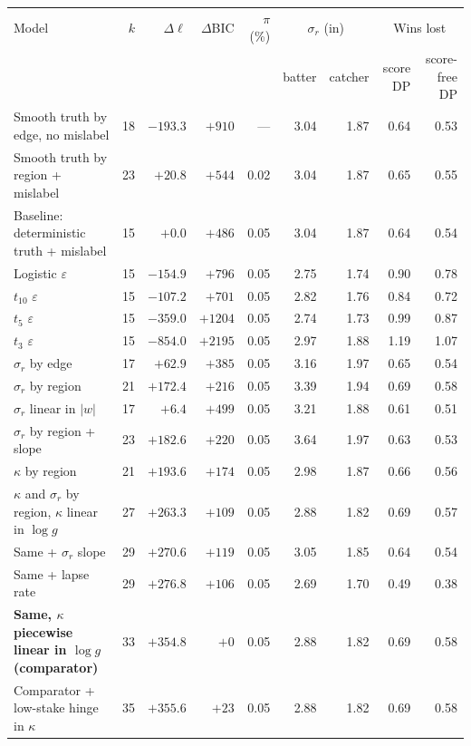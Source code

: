 \begin{tabular}{lrrrrrrrr}
\toprule
Model & $k$ & $\Delta\ell$ & $\Delta$BIC & $\pi$ (\%) & \multicolumn{2}{c}{$\sigma_r$ (in)} & \multicolumn{2}{c}{Wins lost} \\
& & & & & batter & catcher & score DP & score-free DP \\
\midrule
Smooth truth by edge, no mislabel & 18 & $-193.3$ & $+910$ & --- & 3.04 & 1.87 & 0.64 & 0.53 \\
Smooth truth by region + mislabel & 23 & $+20.8$ & $+544$ & 0.02 & 3.04 & 1.87 & 0.65 & 0.55 \\
Baseline: deterministic truth + mislabel & 15 & $+0.0$ & $+486$ & 0.05 & 3.04 & 1.87 & 0.64 & 0.54 \\
Logistic $\varepsilon$ & 15 & $-154.9$ & $+796$ & 0.05 & 2.75 & 1.74 & 0.90 & 0.78 \\
$t_{10}$ $\varepsilon$ & 15 & $-107.2$ & $+701$ & 0.05 & 2.82 & 1.76 & 0.84 & 0.72 \\
$t_{5}$ $\varepsilon$ & 15 & $-359.0$ & $+1204$ & 0.05 & 2.74 & 1.73 & 0.99 & 0.87 \\
$t_{3}$ $\varepsilon$ & 15 & $-854.0$ & $+2195$ & 0.05 & 2.97 & 1.88 & 1.19 & 1.07 \\
$\sigma_r$ by edge & 17 & $+62.9$ & $+385$ & 0.05 & 3.16 & 1.97 & 0.65 & 0.54 \\
$\sigma_r$ by region & 21 & $+172.4$ & $+216$ & 0.05 & 3.39 & 1.94 & 0.69 & 0.58 \\
$\sigma_r$ linear in $|w|$ & 17 & $+6.4$ & $+499$ & 0.05 & 3.21 & 1.88 & 0.61 & 0.51 \\
$\sigma_r$ by region + slope & 23 & $+182.6$ & $+220$ & 0.05 & 3.64 & 1.97 & 0.63 & 0.53 \\
$\kappa$ by region & 21 & $+193.6$ & $+174$ & 0.05 & 2.98 & 1.87 & 0.66 & 0.56 \\
$\kappa$ and $\sigma_r$ by region, $\kappa$ linear in $\log g$ & 27 & $+263.3$ & $+109$ & 0.05 & 2.88 & 1.82 & 0.69 & 0.57 \\
Same + $\sigma_r$ slope & 29 & $+270.6$ & $+119$ & 0.05 & 3.05 & 1.85 & 0.64 & 0.54 \\
Same + lapse rate & 29 & $+276.8$ & $+106$ & 0.05 & 2.69 & 1.70 & 0.49 & 0.38 \\
\textbf{Same, $\kappa$ piecewise linear in $\log g$ (comparator)} & 33 & $+354.8$ & $+0$ & 0.05 & 2.88 & 1.82 & 0.69 & 0.58 \\
Comparator + low-stake hinge in $\kappa$ & 35 & $+355.6$ & $+23$ & 0.05 & 2.88 & 1.82 & 0.69 & 0.58 \\

\end{tabular}
